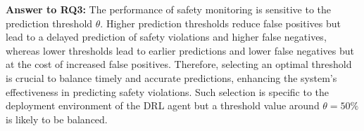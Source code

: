 \documentclass{article}
\begin{document}
\begin{tcolorbox}
\textbf{Answer to RQ3:} The performance of safety monitoring is sensitive to the prediction threshold $\theta$. Higher prediction thresholds reduce false positives but lead to a delayed prediction of safety violations and higher false negatives, whereas lower thresholds lead to earlier predictions and lower false negatives but at the cost of increased false positives. Therefore, selecting an optimal threshold is crucial to balance timely and accurate predictions, enhancing the system's effectiveness in predicting safety violations. Such selection is specific to the deployment environment of the DRL agent but a threshold value around $\theta=50\%$ is likely to be balanced.
\end{tcolorbox}
\end{document}
